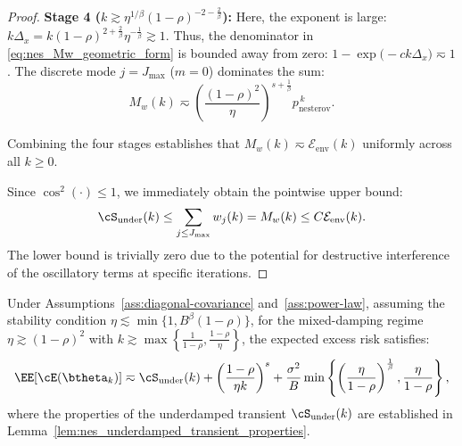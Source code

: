 \documentclass[11pt]{article}
\newcommand{\nesterov}{\mathrm{nesterov}}
\begin{document}
\begin{proof}
\medskip
\noindent\textbf{Stage 4 ($k \gtrsim \eta^{1/\beta}(1-\rho)^{-2-\frac{2}{\beta}}$):}
Here, the exponent is large: $k \Delta_x = k (1-\rho)^{2+\frac{2}{\beta}} \eta^{-\frac{1}{\beta}} \gtrsim 1$. Thus, the denominator in \eqref{eq:nes_Mw_geometric_form} is bounded away from zero: $1 - \exp\bigl(-c k \Delta_x\bigr) \eqsim 1$. The discrete mode $j = J_{\max}$ ($m=0$) dominates the sum:
\[
    M_w(k) \eqsim \left(\frac{(1-\rho)^2}{\eta}\right)^{s+\frac{1}{\beta}} p_{\nesterov}^{\,k}.
\]

\medskip
\noindent Combining the four stages establishes that $M_w(k) \eqsim \mathcal{E}_{\mathrm{env}}(k)$ uniformly across all $k \ge 0$.

Since $\cos^2(\cdot) \le 1$, we immediately obtain the pointwise upper bound:
\[
    \cS_{\mathrm{under}}(k) \le \sum_{j \le J_{\max}} w_j(k) = M_w(k) \le C \mathcal{E}_{\mathrm{env}}(k).
\]
The lower bound is trivially zero due to the potential for destructive interference of the oscillatory terms at specific iterations.
\end{proof}


\begin{theorem}
\label{thm:nes_two_sided_scaling}
Under Assumptions~\ref{ass:diagonal-covariance} and~\ref{ass:power-law}, assuming the stability condition \(\eta\lesssim\min\{1, B^\beta(1-\rho)\}\), for the mixed-damping regime $\eta\gtrsim(1-\rho)^2$ with $k \gtrsim \max\left\{\frac{1}{1-\rho}, \frac{1-\rho}{\eta}\right\}$, the expected excess risk satisfies:
\begin{equation}
\label{eq:nes_mixed_scaling_law}
    \EE[\cE(\btheta_k)] \eqsim \cS_{\mathrm{under}}(k) + \left(\frac{1-\rho}{\eta k}\right)^s + \frac{\sigma^2}{B} \min\left\{ \left(\frac{\eta}{1-\rho}\right)^{\frac1\beta}, \frac{\eta}{1-\rho} \right\},
\end{equation}
where the properties of the underdamped transient $\cS_{\mathrm{under}}(k)$ are established in Lemma~\ref{lem:nes_underdamped_transient_properties}.
\end{theorem}
\end{document}
